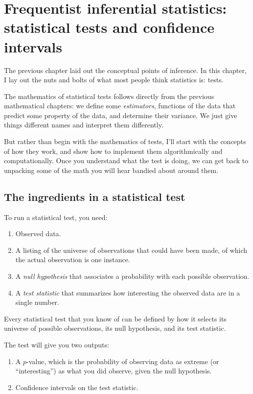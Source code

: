 
\chapter{Frequentist inferential statistics: statistical tests and confidence intervals}

The previous chapter laid out the conceptual points of inference. In this chapter, I lay out the nuts and bolts of what most people think statistics is: tests.

The mathematics of statistical tests follows directly from the previous mathematical chapters: we define some \emph{estimators}, functions of the data that predict some property of the data, and determine their variance. We just give things different names and interpret them differently.

But rather than begin with the mathematics of tests, I'll start with the concepts of how they work, and show how to implement them algorithmically and computationally. Once you understand what the test is doing, we can get back to unpacking some of the math you will hear bandied about around them.

\section{The ingredients in a statistical test}

To run a statistical test, you need:

\begin{enumerate}
\item Observed data.
\item A listing of the universe of observations that could have been made, of which the actual observation is one instance.
\item A \emph{null hypothesis} that associates a probability with each possible observation.
\item A \emph{test statistic} that summarizes how interesting the observed data are in a single number.
\end{enumerate}

Every statistical test that you know of can be defined by how it selects its
universe of possible observations, its null hypothesis, and its test statistic.

The test will give you two outputs:

\begin{enumerate}
\item A $p$-value, which is the probability of observing data as extreme (or ``interesting'') as what you did observe, given the null hypothesis.
\item Confidence intervals on the test statistic.
\end{enumerate}

